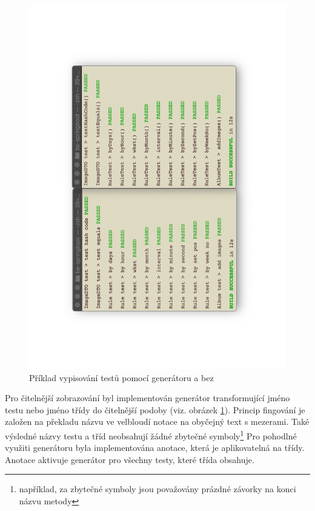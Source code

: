     \begin{figure}\centering
	   \includegraphics[angle=-90, width=1.0\textwidth]{pdfs/pretty-tests-comparison}
	   \caption[Srovnaní zobrazováni kódu]{Příklad vypisování testů pomocí generátoru a bez}\label{image:pretty-tests-comparison}
    \end{figure}
    Pro čitelnější zobrazování byl implementován generátor transformující jméno testu nebo jméno třídy do čitelnější podoby (viz. obrázek \ref{image:pretty-tests-comparison}). Princip fingování je založen na překladu názvu ve velbloudí notace na obyčejný text s mezerami. Také výsledné názvy testu a tříd neobsahují žádné zbytečné symboly\footnote{například, za zbytečné symboly jsou považovány prázdné závorky na konci názvu metody} Pro pohodlné využiti generátoru byla implementována anotace, která je aplikovatelná na třídy. Anotace aktivuje generátor pro všechny testy, které třída obsahuje. 
    
